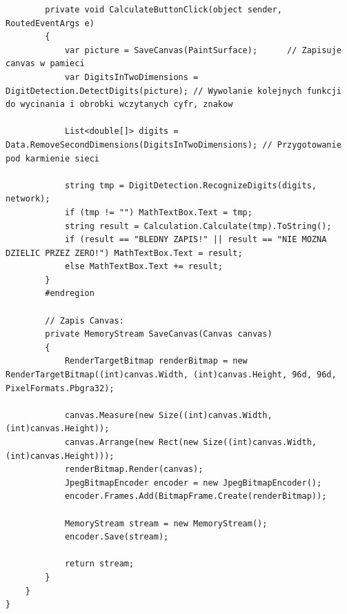 \documentclass[12pt,a4paper]{article}
\begin{document}
\begin{lstlisting}
        private void CalculateButtonClick(object sender, RoutedEventArgs e)
        {
            var picture = SaveCanvas(PaintSurface);      // Zapisuje canvas w pamieci
            var DigitsInTwoDimensions = DigitDetection.DetectDigits(picture); // Wywolanie kolejnych funkcji do wycinania i obrobki wczytanych cyfr, znakow

            List<double[]> digits = Data.RemoveSecondDimensions(DigitsInTwoDimensions); // Przygotowanie pod karmienie sieci 

            string tmp = DigitDetection.RecognizeDigits(digits, network);
            if (tmp != "") MathTextBox.Text = tmp;
            string result = Calculation.Calculate(tmp).ToString();
            if (result == "BLEDNY ZAPIS!" || result == "NIE MOZNA DZIELIC PRZEZ ZERO!") MathTextBox.Text = result;
            else MathTextBox.Text += result;
        }
        #endregion

        // Zapis Canvas:
        private MemoryStream SaveCanvas(Canvas canvas)
        {
            RenderTargetBitmap renderBitmap = new RenderTargetBitmap((int)canvas.Width, (int)canvas.Height, 96d, 96d, PixelFormats.Pbgra32);
            
            canvas.Measure(new Size((int)canvas.Width, (int)canvas.Height));
            canvas.Arrange(new Rect(new Size((int)canvas.Width, (int)canvas.Height)));
            renderBitmap.Render(canvas);
            JpegBitmapEncoder encoder = new JpegBitmapEncoder();
            encoder.Frames.Add(BitmapFrame.Create(renderBitmap));

            MemoryStream stream = new MemoryStream();
            encoder.Save(stream);

            return stream;
        }
    }
}
	\end{lstlisting}

\vspace{20pt}
\end{document}
